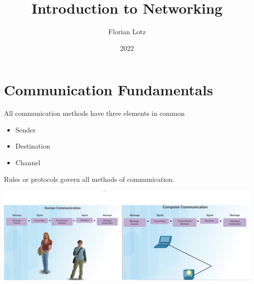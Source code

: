 \documentclass[11pt]{article}
\title{Introduction to Networking}
\author{Florian Lotz}
\date{2022}
\begin{document}
\maketitle
\tableofcontents
\pagebreak

\section{Communication Fundamentals}
    All communication methods have three elements in common\
    \begin{itemize}
    \item Sender
    \item Destination
    \item Channel
    \end{itemize}
    Rules or protocols govern all methods of communication.

    \includegraphics[width=\textwidth]{communication-fundamentals}
\end{document}
